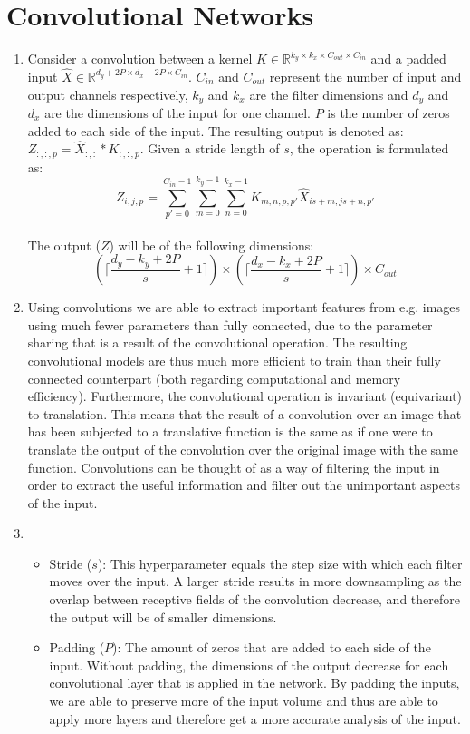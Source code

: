 \documentclass{article}
\begin{document}
\section{Convolutional Networks}
\begin{enumerate}[label=(\alph*)]
	\item Consider a convolution between a kernel $K \in \mathbb{R}^{k_y \times k_x \times C_{out} \times C_{in}}$ and a padded input $\hat{X} \in \mathbb{R}^{d_y+2P \times d_x+2P \times C_{in}}$. $C_{in}$ and $C_{out}$ represent the number of input and output channels respectively, $k_y$ and $k_x$ are the filter dimensions and $d_y$ and $d_x$ are the dimensions of the input for one channel. $P$ is the number of zeros added to each side of the input. The resulting output is denoted as: $Z_{:, :, p} = \hat{X}_{:, :} * K_{:, :, p}$. Given a stride length of $s$, the operation is formulated as: $$Z_{i, j, p} = \sum_{p'=0}^{C_{in}-1}\sum_{m=0}^{k_y-1}\sum_{n=0}^{k_x-1} K_{m, n, p, p'}\hat{X}_{is+m, js+n, p'}$$ \\ The output ($Z$) will be of the following dimensions: $$\left(\lceil \frac{d_y - k_y + 2P}{s}+1 \rceil\right) \times \left(\lceil \frac{d_x - k_x + 2P}{s}+1 \rceil\right) \times C_{out}$$
	\item Using convolutions we are able to extract important features from e.g. images using much fewer parameters than fully connected, due to the parameter sharing that is a result of the convolutional operation. The resulting convolutional models are thus much more efficient to train than their fully connected counterpart (both regarding computational and memory efficiency). Furthermore, the convolutional operation is invariant (equivariant) to translation. This means that the result of a convolution over an image that has been subjected to a translative function is the same as if one were to translate the output of the convolution over the original image with the same function. Convolutions can be thought of as a way of filtering the input in order to extract the useful information and filter out the unimportant aspects of the input. 
	\item \begin{itemize}
		\item Stride ($s$): This hyperparameter equals the step size with which each filter moves over the input. A larger stride results in more downsampling as the overlap between receptive fields of the convolution decrease, and therefore the output will be of smaller dimensions.
		\item Padding ($P$): The amount of zeros that are added to each side of the input. Without padding, the dimensions of the output decrease for each convolutional layer that is applied in the network. By padding the inputs, we are able to preserve more of the input volume and thus are able to apply more layers and therefore get a more accurate analysis of the input.

\end{itemize}
\end{enumerate}
\end{document}
